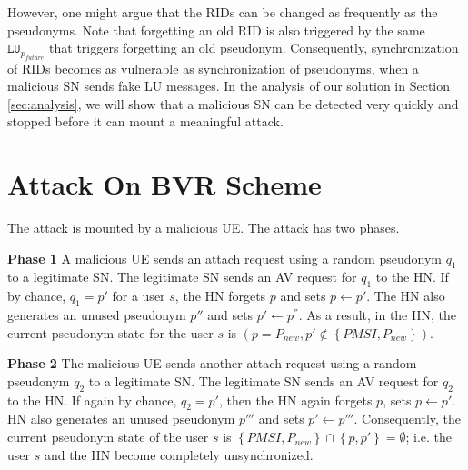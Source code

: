 \documentclass{llncs} %
\begin{document}
However, one might argue that the RIDs can be changed as frequently as the pseudonyms. Note that forgetting an old RID is also triggered by the same $\texttt{LU}_{p_{future}}$ that triggers forgetting an old pseudonym. Consequently, synchronization of RIDs becomes as vulnerable as synchronization of pseudonyms, when a malicious SN sends fake LU messages. In the analysis of our solution in Section \ref{sec:analysis}, we will show that a malicious SN can be detected very quickly and stopped before it can mount a meaningful attack.

\section{Attack On BVR Scheme} \label{sec:attack}
The attack is mounted by a malicious UE. The attack has two phases. 


\textbf{Phase 1 } A malicious UE sends an attach request using a random pseudonym $q_1$ to a legitimate SN. The legitimate SN sends an AV request for $q_1$ to the HN. If by chance, $q_1 = p'$ for a user $s$, the HN forgets $p$ and sets $p \leftarrow p'$. The HN also generates an unused pseudonym $p''$ and sets $p' \leftarrow p^{''}$. As a result, in the HN, the current  pseudonym state for the user $s$ is $\left(p = P_{new},p' \notin \left\lbrace PMSI,P_{new} \right\rbrace \right)$. %

\textbf{Phase 2 }The malicious UE sends another attach request using a random pseudonym $q_2$ to a legitimate SN. The legitimate SN sends an AV request for $q_2$ to the HN. If again by chance, $q_2 = p'$, then the HN again forgets $p$, sets $p \leftarrow p'$. HN also generates an unused pseudonym $p'''$ and sets $p' \leftarrow p'''$. Consequently, the current pseudonym state of the user $s$ is $\left\lbrace PMSI,P_{new} \right\rbrace \cap \left\lbrace p,p' \right\rbrace = \emptyset$; i.e. the user $s$ and the HN become completely unsynchronized. %

\end{document}
